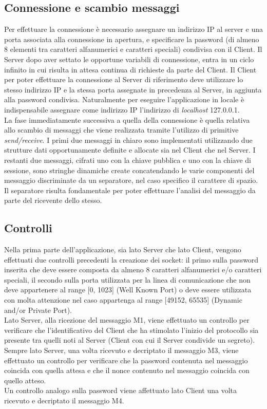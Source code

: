 \documentclass[12pt, a4paper]{article}
\begin{document}
\subsection{Connessione e scambio messaggi}
Per effettuare la connessione è necessario assegnare un indirizzo IP al server e una porta associata alla connessione in apertura, e specificare la password (di almeno 8 elementi tra caratteri alfanumerici e caratteri speciali) condivisa con il Client. Il Server dopo aver settato le opportune variabili di connessione, entra in un ciclo infinito in cui risulta in attesa continua di richieste da parte del Client. Il Client per poter effettuare la connessione al Server di riferimento deve utilizzare lo stesso indirizzo IP e la stessa porta assegnate in precedenza al Server, in aggiunta alla password condivisa. Naturalmente per eseguire l'applicazione in locale è indispensabile assegnare come indirizzo IP l'indirizzo di \textit{localhost} 127.0.0.1.\\
La fase immediatamente successiva a quella della connessione è quella relativa allo scambio di messaggi che viene realizzata tramite l'utilizzo di primitive \textit{send/receive}. I primi due messaggi in chiaro sono implementati utilizzando due strutture dati opportunamente definite e allocate sia nel Client che nel Server. I restanti due messaggi, cifrati uno con la chiave pubblica e uno con la chiave di sessione, sono stringhe dinamiche create concatendando le varie componenti del messaggio discriminate da un separatore, nel caso specifico il carattere di spazio. Il separatore risulta fondamentale per poter effettuare l'analisi del messaggio da parte del ricevente dello stesso.
\subsection{Controlli}
Nella prima parte dell'applicazione, sia lato Server che lato Client, vengono effettuati due controlli precedenti la creazione dei socket: il primo sulla password inserita che deve essere composta da almeno 8 caratteri alfanumerici e/o caratteri speciali, il secondo sulla porta utilizzata per la linea di comunicazione che non deve appartenere al range [0, 1023] (Well Known Port) o deve essere utilizzata con molta attenzione nel caso appartenga al range [49152, 65535] (Dynamic and/or Private Port).\\
Lato Server, alla ricezione del messaggio M1, viene effettuato un controllo per verificare che l'identificativo del Client che ha stimolato l'inizio del protocollo sia presente tra quelli noti al Server (Client con cui il Server condivide un segreto).\\
Sempre lato Server, una volta ricevuto e decriptato il messaggio M3, viene effettuato un controllo per verificare che la password contenuta nel messaggio coincida con quella attesa e che il nonce contenuto nel messaggio coincida con quello atteso.\\
Un controllo analogo sulla password viene affettuato lato Client una volta ricevuto e decriptato il messaggio M4.
\end{document}
